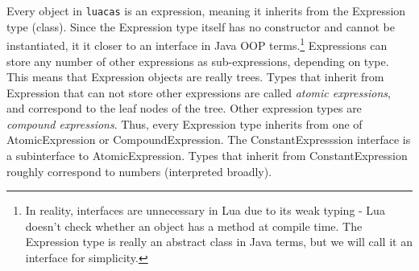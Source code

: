 \documentclass{article}
\begin{document}
Every object in \texttt{luacas} is an expression, meaning it inherits from the {\ttfamily Expression} type (class). Since the {\ttfamily Expression} type itself has no constructor and cannot be instantiated, it it closer to an interface in Java OOP terms.\footnote{In reality, interfaces are unnecessary in Lua due to its weak typing - Lua doesn't check whether an object has a method at compile time. The {\ttfamily Expression} type is really an abstract class in Java terms, but we will call it an interface for simplicity.} {\ttfamily Expression}s can store any number of other expressions as sub-expressions, depending on type. This means that {\ttfamily Expression} objects are really trees. Types that inherit from {\ttfamily Expression} that can not store other expressions are called \emph{atomic expressions}, and correspond to the leaf nodes of the tree. Other expression types are \emph{compound expressions}. Thus, every {\ttfamily Expression} type inherits from one of {\ttfamily AtomicExpression} or {\ttfamily CompoundExpression}. The {\ttfamily ConstantExpresssion} interface is a subinterface to {\ttfamily AtomicExpression}. Types that inherit from {\ttfamily ConstantExpression} roughly correspond to numbers (interpreted broadly). 
\end{document}
